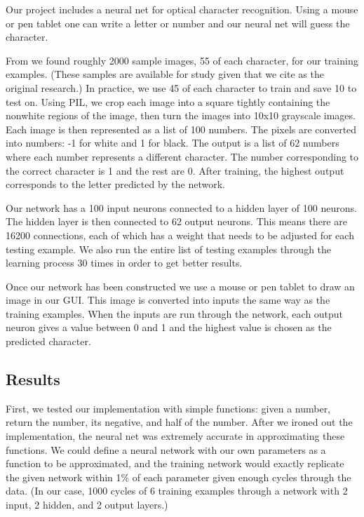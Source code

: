 \documentclass[11pt,a4paper]{article}
\begin{document}
Our project includes a neural net for optical character recognition. Using a mouse or pen tablet one can write a letter or number and our neural net will guess the character.

From  we found roughly 2000 sample images, 55 of each character, for our training examples. (These samples are available for study given that we cite  as the original research.) In practice, we use 45 of each character to train and save 10 to test on. Using PIL, we crop each image into a square tightly containing the nonwhite regions of the image, then turn the images into 10x10 grayscale images. Each image is then represented as a list of 100 numbers. The pixels are converted into numbers: -1 for white and 1 for black. The output is a list of 62 numbers where each number represents a different character. The number corresponding to the correct character is 1 and the rest are 0. After training, the highest output corresponds to the letter predicted by the network.

Our network has a 100 input neurons connected to a hidden layer of 100 neurons. The hidden layer is then connected to 62 output neurons. This means there are 16200 connections, each of which has a weight that needs to be adjusted for each testing example. We also run the entire list of testing examples through the learning process 30 times in order to get better results.	

Once our network has been constructed we use a mouse or pen tablet to draw an image in our GUI. This image is converted into inputs the same way as the training examples. When the inputs are run through the network, each output neuron gives a value between 0 and 1 and the highest value is chosen as the predicted character.

\subsection{Results}
\label{Artificial Neural Nets:Results}

First, we tested our implementation with simple functions: given a number, return the number, its negative, and half of the number. After we ironed out the implementation, the neural net was extremely accurate in approximating these functions. We could define a neural network with our own parameters as a function to be approximated, and the training network would exactly replicate the given network within 1\% of each parameter given enough cycles through the data. (In our case, 1000 cycles of 6 training examples through a network with 2 input, 2 hidden, and 2 output layers.)
\end{document}
